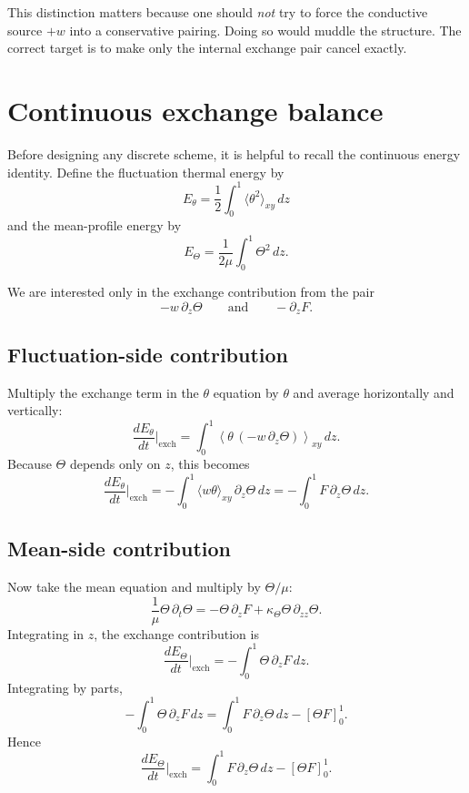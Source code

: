 \documentclass[11pt]{article}
\begin{document}
This distinction matters because one should \emph{not} try to force the conductive source $+w$ into a conservative pairing. Doing so would muddle the structure. The correct target is to make only the internal exchange pair cancel exactly.

\section{Continuous exchange balance}

Before designing any discrete scheme, it is helpful to recall the continuous energy identity. Define the fluctuation thermal energy by
\[
E_\theta
=
\frac12
\int_0^1
\langle \theta^2 \rangle_{xy}
\,dz
\]
and the mean-profile energy by
\[
E_\Theta
=
\frac{1}{2\mu}
\int_0^1
\Theta^2
\,dz.
\]

We are interested only in the exchange contribution from the pair
\[
-w\,\partial_z\Theta
\qquad\text{and}\qquad
-\partial_z F.
\]

\subsection{Fluctuation-side contribution}

Multiply the exchange term in the $\theta$ equation by $\theta$ and average horizontally and vertically:
\[
\frac{dE_\theta}{dt}\Big|_{\mathrm{exch}}
=
\int_0^1
\left\langle
\theta\,
(-w\,\partial_z\Theta)
\right\rangle_{xy}
\,dz.
\]
Because $\Theta$ depends only on $z$, this becomes
\begin{equation}
\frac{dE_\theta}{dt}\Big|_{\mathrm{exch}}
=
-
\int_0^1
\langle w\theta\rangle_{xy}\,
\partial_z\Theta
\,dz
=
-
\int_0^1
F\,\partial_z\Theta
\,dz.
\label{eq:Etheta-cont}
\end{equation}

\subsection{Mean-side contribution}

Now take the mean equation and multiply by $\Theta/\mu$:
\[
\frac{1}{\mu}\Theta\,\partial_t\Theta
=
-\Theta\,\partial_z F
+
\kappa_\Theta \Theta\,\partial_{zz}\Theta.
\]
Integrating in $z$, the exchange contribution is
\begin{equation}
\frac{dE_\Theta}{dt}\Big|_{\mathrm{exch}}
=
-
\int_0^1
\Theta\,\partial_z F
\,dz.
\label{eq:ETheta-cont-raw}
\end{equation}
Integrating by parts,
\[
-
\int_0^1
\Theta\,\partial_z F
\,dz
=
\int_0^1
F\,\partial_z\Theta
\,dz
-
\left[\Theta F\right]_{0}^{1}.
\]
Hence
\begin{equation}
\frac{dE_\Theta}{dt}\Big|_{\mathrm{exch}}
=
\int_0^1
F\,\partial_z\Theta
\,dz
-
\left[\Theta F\right]_{0}^{1}.
\label{eq:ETheta-cont}
\end{equation}
\end{document}
